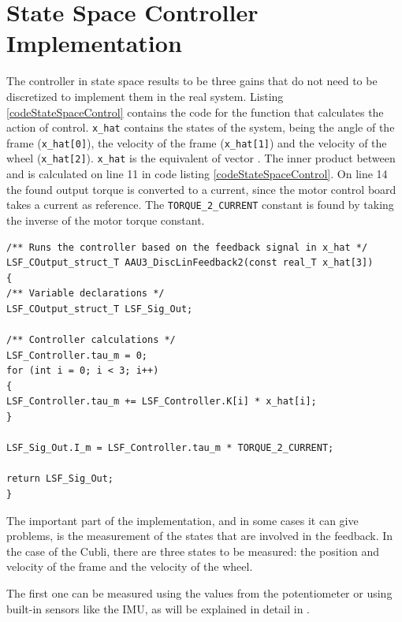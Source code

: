 \section{State Space Controller Implementation}\label{sec:SSImplementation}
The controller in state space results to be three gains that do not need to be discretized to implement them in the real system. Listing \ref{codeStateSpaceControl} contains the code for the function that calculates the action of control.
\lstinline[style=customcppinline]{x_hat} contains the states of the system, being the angle of the frame (\lstinline[style=customcppinline]{x_hat[0]}), the velocity of the frame (\lstinline[style=customcppinline]{x_hat[1]}) and the velocity of the wheel (\lstinline[style=customcppinline]{x_hat[2]}). \lstinline[style=customcppinline]{x_hat} is the equivalent of vector \si{}. The inner product between \si{} and \si{} is calculated on line 11 in code listing \ref{codeStateSpaceControl}. On line 14 the found output torque is converted to a current, since the motor control board takes a current as reference. The \lstinline[style=customcppinline]{TORQUE_2_CURRENT} constant is found by taking the inverse of the motor torque constant.
\newpage
\begin{lstlisting}[style = customcpp,
                  caption  = {Code for the implementation of the State Space Controller. The feedback from the Cubli is contained in the array x\_hat.},
                  label    = codeStateSpaceControl ]
/** Runs the controller based on the feedback signal in x_hat */
LSF_COutput_struct_T AAU3_DiscLinFeedback2(const real_T x_hat[3])
{
/** Variable declarations */
LSF_COutput_struct_T LSF_Sig_Out;

/** Controller calculations */
LSF_Controller.tau_m = 0;
for (int i = 0; i < 3; i++)
{
LSF_Controller.tau_m += LSF_Controller.K[i] * x_hat[i];
}

LSF_Sig_Out.I_m = LSF_Controller.tau_m * TORQUE_2_CURRENT;

return LSF_Sig_Out;
}
\end{lstlisting}
The important part of the implementation, and in some cases it can give problems, is the measurement of the states that are involved in the feedback.
In the case of the Cubli, there are three states to be measured: the position and velocity of the frame and the velocity of the wheel.

The first one can be measured using the values from the potentiometer or using built-in sensors like the IMU, as will be explained in detail in .

